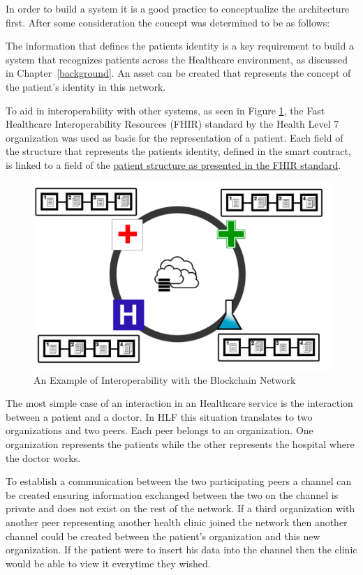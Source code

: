 In order to build a system it is a good practice to conceptualize the
architecture first. After some consideration the concept was determined to be
as follows:

The information that defines the patients identity is a key requirement to
build a system that recognizes patients across the Healthcare environment, as
discussed in Chapter~\ref{background}. An asset can be created that represents
the concept of the patient's identity in this network.

To aid in interoperability with other systems, as seen in Figure
\ref{fig:interoperability}, the Fast Healthcare Interoperability Resources
(FHIR) standard by the Health Level 7 organization was used as basis for the
representation of a patient.  Each field of the structure that represents the
patients identity, defined in the smart contract, is linked to a field of the
\href{http://www.hl7.org/fhir/patient.html}{patient structure as presented in
the FHIR standard}.

\begin{figure}[ht] \centering
\includegraphics[width=0.7\linewidth]{imgs/interoperability.png}
\caption{\label{fig:interoperability}An Example of Interoperability with the
Blockchain Network} \end{figure}


The most simple case of an interaction in an Healthcare service is the
interaction between a patient and a doctor. In HLF this situation translates to
two organizations and two peers. Each peer belongs to an organization. One
organization represents the patients while the other represents the hospital
where the doctor works. 

To establish a communication between the two participating peers a channel can
be created ensuring information exchanged between the two on the channel is
private and does not exist on the rest of the network.  If a third organization
with another peer representing another health clinic joined the network then
another channel could be created between the patient's organization and this
new organization. If the patient were to insert his data into the channel then
the clinic would be able to view it everytime they wished. 

